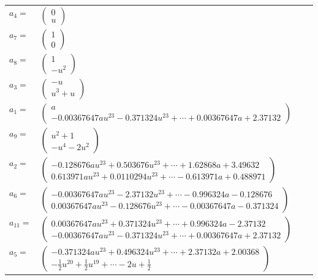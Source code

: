 \documentclass[1p]{elsarticle_modified}
\theoremstyle{definition}
\begin{document}
\begin{tabular}{m{7pt} m{180pt} m{7pt} m{180pt} }
\flushright $a_{4}=$&$\begin{pmatrix}0\\u\end{pmatrix}$ \\
\flushright $a_{7}=$&$\begin{pmatrix}1\\0\end{pmatrix}$ \\
\flushright $a_{8}=$&$\begin{pmatrix}1\\- u^2\end{pmatrix}$ \\
\flushright $a_{3}=$&$\begin{pmatrix}- u\\u^3+u\end{pmatrix}$ \\
\flushright $a_{1}=$&$\begin{pmatrix}a\\-0.00367647 a u^{23}-0.371324 u^{23}+\cdots+0.00367647 a+2.37132\end{pmatrix}$ \\
\flushright $a_{9}=$&$\begin{pmatrix}u^2+1\\- u^4-2 u^2\end{pmatrix}$ \\
\flushright $a_{2}=$&$\begin{pmatrix}-0.128676 a u^{23}+0.503676 u^{23}+\cdots+1.62868 a+3.49632\\0.613971 a u^{23}+0.0110294 u^{23}+\cdots-0.613971 a+0.488971\end{pmatrix}$ \\
\flushright $a_{6}=$&$\begin{pmatrix}-0.00367647 a u^{23}-2.37132 u^{23}+\cdots-0.996324 a-0.128676\\0.00367647 a u^{23}-0.128676 u^{23}+\cdots-0.00367647 a-0.371324\end{pmatrix}$ \\
\flushright $a_{11}=$&$\begin{pmatrix}0.00367647 a u^{23}+0.371324 u^{23}+\cdots+0.996324 a-2.37132\\-0.00367647 a u^{23}-0.371324 u^{23}+\cdots+0.00367647 a+2.37132\end{pmatrix}$ \\
\flushright $a_{5}=$&$\begin{pmatrix}-0.371324 a u^{23}+0.496324 u^{23}+\cdots+2.37132 a+2.00368\\-\frac{1}{2} u^{20}+\frac{1}{2} u^{19}+\cdots-2 u+\frac{1}{2}\end{pmatrix}$ \\

\end{tabular}
\end{document}
